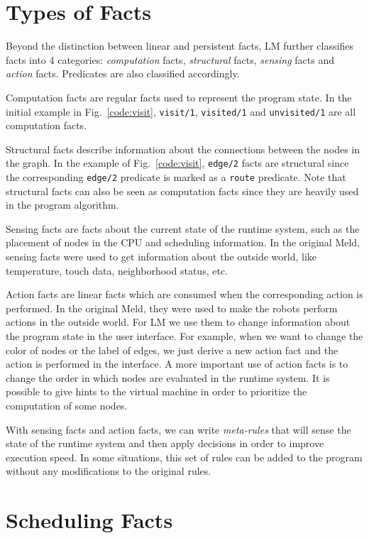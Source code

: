 \section{Types of Facts}

Beyond the distinction between linear and persistent facts, LM further classifies facts
into 4 categories: \emph{computation} facts, \emph{structural} facts, \emph{sensing} facts
and \emph{action} facts. Predicates are also classified accordingly.

Computation facts are regular facts used to represent the program state. In the initial
example in Fig.~\ref{code:visit}, \texttt{visit/1}, \texttt{visited/1} and \texttt{unvisited/1}
are all computation facts.

Structural facts describe information about the connections between the nodes in the graph.
In the example of Fig.~\ref{code:visit}, \texttt{edge/2} facts are structural since the
corresponding \texttt{edge/2} predicate is
marked as a \texttt{route} predicate. Note that structural facts can also be seen as
computation facts since they are heavily used in the program algorithm.

Sensing facts are facts about the current state of the runtime system, such as the placement
of nodes in the CPU and scheduling information. In the original Meld, sensing facts
were used to get information about the outside world, like temperature, touch data,
neighborhood status, etc.

Action facts are linear facts which are consumed when the corresponding action is performed.
In the original Meld, they were used to make the robots perform actions in the outside world.
For LM we use them to change information about the program state
in the user interface. For example, when we want to change the color of nodes or the label
of edges, we just derive a new action fact and the action is performed in the interface.
A more important use of action facts is to change the order in which nodes
are evaluated in the runtime system. It is possible to give hints to the virtual
machine in order to prioritize the computation of some nodes.

With sensing facts and action facts, we can write \emph{meta-rules} that will sense the
state of the runtime system and then apply decisions in order to improve execution speed.
In some situations, this set of rules can be added to the program without any modifications
to the original rules.


\section{Scheduling Facts}

